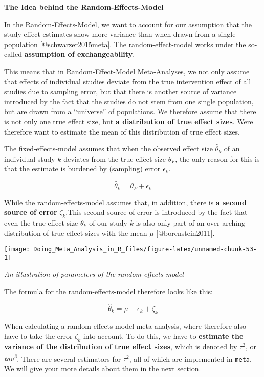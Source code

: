\documentclass[]{book}
\theoremstyle{definition}
\theoremstyle{definition}
\theoremstyle{definition}
\theoremstyle{remark}
\begin{document}
\begin{rmdinfo}
\textbf{The Idea behind the Random-Effects-Model}

In the Random-Effects-Model, we want to account for our assumption that
the study effect estimates show more variance than when drawn from a
single population {[}@schwarzer2015meta{]}. The random-effect-model
works under the so-called \textbf{assumption of exchangeability}.

This means that in Random-Effect-Model Meta-Analyses, we not only assume
that effects of individual studies deviate from the true intervention
effect of all studies due to sampling error, but that there is another
source of variance introduced by the fact that the studies do not stem
from one single population, but are drawn from a ``universe'' of
populations. We therefore assume that there is not only one true effect
size, but \textbf{a distribution of true effect sizes}. Were therefore
want to estimate the mean of this distribution of true effect sizes.

The fixed-effects-model assumes that when the observed effect size
\(\hat\theta_k\) of an individual study \(k\) deviates from the true
effect size \(\theta_F\), the only reason for this is that the estimate
is burdened by (sampling) error \(\epsilon_k\).

\[\hat\theta_k = \theta_F + \epsilon_k\]

While the random-effects-model assumes that, in addition, there is
\textbf{a second source of error} \(\zeta_k\).This second source of
error is introduced by the fact that even the true effect size
\(\theta_k\) of our study \(k\) is also only part of an over-arching
distribution of true effect sizes with the mean \(\mu\)
{[}@borenstein2011{]}.
\end{rmdinfo}

\begin{center}\texttt{[image: Doing\_Meta\_Analysis\_in\_R\_files/figure-latex/unnamed-chunk-53-1]} \end{center}

\emph{An illustration of parameters of the random-effects-model}

\begin{rmdinfo}
The formula for the random-effects-model therefore looks like this:

\[\hat\theta_k = \mu + \epsilon_k + \zeta_k\]

When calculating a random-effects-model meta-analysis, where therefore
also have to take the error \(\zeta_k\) into account. To do this, we
have to \textbf{estimate the variance of the distribution of true effect
sizes}, which is denoted by \(\tau^{2}\), or
\emph{tau\textsuperscript{2}}. There are several estimators for
\(\tau^{2}\), all of which are implemented in \texttt{meta}. We will
give your more details about them in the next section.
\end{rmdinfo}
\end{document}
